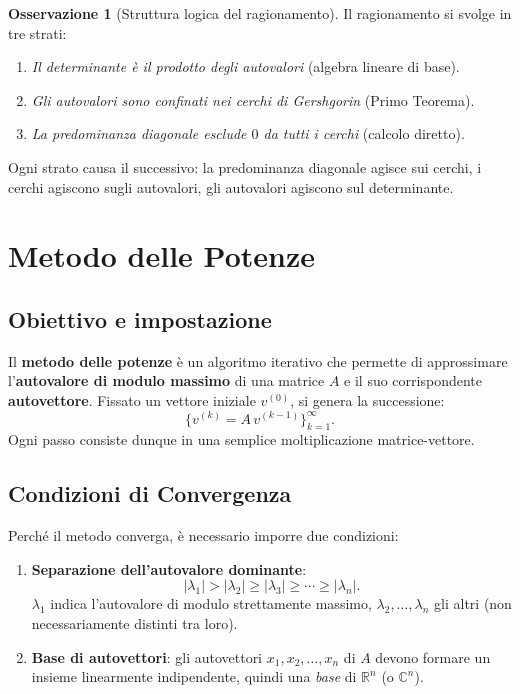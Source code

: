 \documentclass[a4paper,12pt]{article}
\theoremstyle{definition}
\newtheorem{osservazione}{Osservazione}[section]
\theoremstyle{remark}
\begin{document}
\begin{osservazione}[Struttura logica del ragionamento]
Il ragionamento si svolge in tre strati:
\begin{enumerate}
  \item \emph{Il determinante è il prodotto degli autovalori} (algebra lineare di base).
  \item \emph{Gli autovalori sono confinati nei cerchi di Gershgorin} (Primo Teorema).
  \item \emph{La predominanza diagonale esclude $0$ da tutti i cerchi} (calcolo diretto).
\end{enumerate}
Ogni strato causa il successivo: la predominanza diagonale agisce sui cerchi, i cerchi
agiscono sugli autovalori, gli autovalori agiscono sul determinante.
\end{osservazione}

\section{Metodo delle Potenze}

\subsection{Obiettivo e impostazione}

Il \textbf{metodo delle potenze} è un algoritmo iterativo che permette di approssimare
l'\textbf{autovalore di modulo massimo} di una matrice $A$ e il suo corrispondente
\textbf{autovettore}. Fissato un vettore iniziale $v^{(0)}$, si genera la successione:
\[
  \bigl\{ v^{(k)} = A\,v^{(k-1)} \bigr\}_{k=1}^{\infty}.
\]
Ogni passo consiste dunque in una semplice moltiplicazione matrice-vettore.

\subsection{Condizioni di Convergenza}

Perché il metodo converga, è necessario imporre due condizioni:
\begin{enumerate}
  \item \textbf{Separazione dell'autovalore dominante}:
    \[
      |\lambda_1| > |\lambda_2| \geq |\lambda_3| \geq \cdots \geq |\lambda_n|.
    \]
    $\lambda_1$ indica l'autovalore di modulo strettamente massimo, $\lambda_2, \ldots,
    \lambda_n$ gli altri (non necessariamente distinti tra loro).
  \item \textbf{Base di autovettori}: gli autovettori $x_1, x_2, \ldots, x_n$ di $A$
    devono formare un insieme linearmente indipendente, quindi una \emph{base} di
    $\mathbb{R}^n$ (o $\mathbb{C}^n$).
\end{enumerate}
\end{document}
